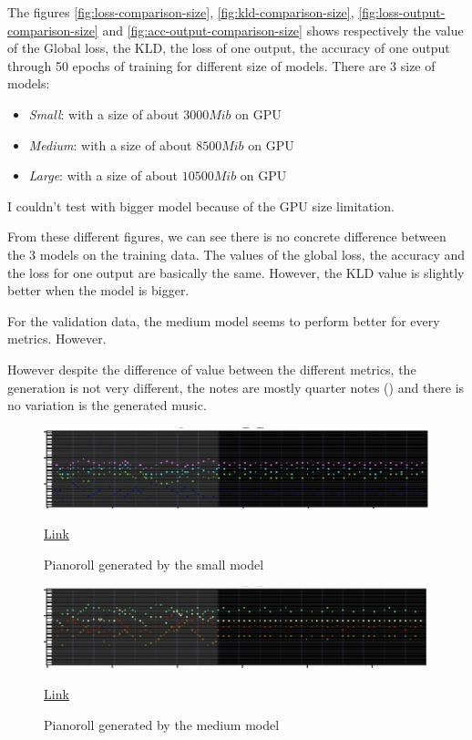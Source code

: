\documentclass[12pt]{report}
\begin{document}
The figures \ref{fig:loss-comparison-size}, \ref{fig:kld-comparison-size}, \ref{fig:loss-output-comparison-size} and \ref{fig:acc-output-comparison-size} shows respectively the value of the Global loss, the KLD, the loss of one output, the accuracy of one output through 50 epochs of training for different size of models.
There are 3 size of models:
\begin{itemize}
    \item \textit{Small}: with a size of about $3000Mib$ on GPU
    \item \textit{Medium}: with a size of about $8500Mib$ on GPU
    \item \textit{Large}: with a size of about $10500Mib$ on GPU
\end{itemize}

I couldn't test with bigger model because of the GPU size limitation.

From these different figures, we can see there is no concrete difference between the 3 models on the training data.
The values of the global loss, the accuracy and the loss for one output are basically the same.
However, the KLD value is slightly better when the model is bigger.

For the validation data, the medium model seems to perform better for every metrics.
However.

However despite the difference of value between the different metrics, the generation is not very different, the notes are mostly quarter notes (\musQuarter) and there is no variation is the generated music.

\begin{figure}[htbp]
    \centering
    \includegraphics[width=\textwidth]{images/experiences/size/generation-comparison-size-small.jpg}
    \caption{Pianoroll generated by the small model}
    \href{https://github.com/ValentinVignal/midiGenerator/blob/master/samples/mode-size-comparison/small.mid}{Link}
    \label{fig:exp:size:generation-small}
\end{figure}

\begin{figure}[htbp]
    \centering
    \includegraphics[width=\textwidth]{images/experiences/size/generation-comparison-size-medium.jpg}
    \caption{Pianoroll generated by the medium model}
    \href{https://github.com/ValentinVignal/midiGenerator/blob/master/samples/mode-size-comparison/medium.mid}{Link}
    \label{fig:exp:size:generation-medium}
\end{figure}
\end{document}
